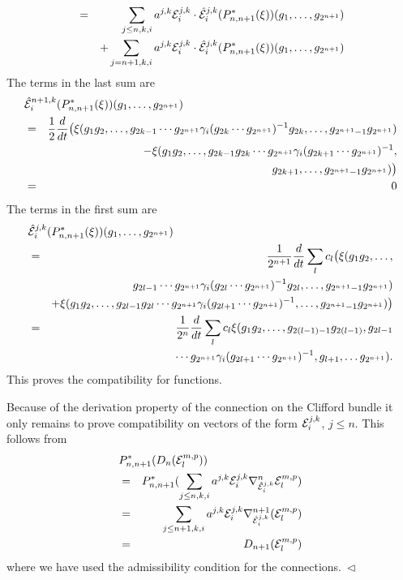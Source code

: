 \documentclass[12pt]{article}
\newcommand{\eproof}{{~\hfill$ \triangleleft$}}
\def\ce{{\cal E}}
\begin{document}
{\begin{eqnarray*}
&=&\sum_{j\leq n,k,i}a^{j,k}\ce_i^{j,k}\cdot \hat{\ce}_i^{j,k}(P^*_{n,n+1}(\xi ))(g_1,\ldots,g_{2^{n+1}})\\
&&+\sum_{j = n+1,k,i}a^{j,k}\ce_i^{j,k}\cdot \hat{\ce}_i^{j,k}(P^*_{n,n+1}(\xi ))(g_1,\ldots,g_{2^{n+1}})
\end{eqnarray*}
The terms in the last sum are
\begin{eqnarray*} 
\lefteqn{\hat{\ce}_i^{n+1,k}(P^*_{n,n+1}(\xi ))(g_1,\ldots,g_{2^{n+1}})}\\
&=& \frac{1}{2}\frac{d}{dt} \big( \xi (g_1g_2,\ldots,g_{2k-1}\cdots g_{2^{n+1}}\gamma_i(g_{2k}\cdots g_{2^{n+1}})^{-1}g_{2k},\ldots,g_{2^{n+1}-1}g_{2^{n+1}})\\
&& -\xi (g_1g_2,\ldots,g_{2k-1} g_{2k}\cdots g_{2^{n+1}}\gamma_i(g_{2k+1}\cdots g_{2^{n+1}})^{-1},\\
&&g_{2k+1},\ldots,g_{2^{n+1}-1}g_{2^{n+1}})\big) \\
&=&0
\end{eqnarray*}
The terms in the first sum are
\begin{eqnarray*}
\lefteqn{\hat{\ce}_i^{j,k}(P^*_{n,n+1}(\xi ))(g_1,\ldots,g_{2^{n+1}})}\\
&=&\frac{1}{2^{n+1}}\frac{d}{dt}\sum_l c_l\big( \xi (g_1g_2,\ldots ,\\
&&g_{2l-1}\cdots g_{2^{n+1}}\gamma_i(g_{2l}\cdots g_{2^{n+1}})^{-1}g_{2l},\ldots,g_{2^{n+1}-1}g_{2^{n+1}})\\
&&+\xi (g_1g_2,\ldots , g_{2l-1}g_{2l}\cdots g_{2^{n+1}}\gamma_i(g_{2l+1}\cdots g_{2^{n+1}})^{-1},\ldots,g_{2^{n+1}-1}g_{2^{n+1}})\big)\\
&=&\frac{1}{2^{n}}\frac{d}{dt}\sum_l c_l \xi(g_1g_2,\ldots, g_{2(l-1)-1}g_{2(l-1)},g_{2l-1}\\
&&\cdots g_{2^{n+1}}\gamma_i (g_{2l+1}\cdots  g_{2^{n+1}})^{-1},g_{l+1},\ldots g_{2^{n+1}}).
\end{eqnarray*}
This proves the compatibility for functions.

Because of the derivation property of the connection on the Clifford bundle it only remains to prove
compatibility on vectors of the form $\ce_i^{j,k}$, $j\leq n$. This follows from
\begin{eqnarray*}
\lefteqn{P^*_{n,n+1}(D_n( \ce_l^{m,p}))}\\
&=&P^*_{n,n+1}(\sum_{j\leq n,k,i}a^{j,k}\ce_i^{j,k}\nabla^n_{\hat{\ce}_i^{j,k}}\ce_l^{m,p})\\
&=&\sum_{j\leq n+1,k,i}a^{j,k}\ce_i^{j,k}\nabla^{n+1}_{\hat{\ce}_i^{j,k}}(\ce_l^{m,p})\\
&=&D_{n+1}(\ce_l^{m,p})
\end{eqnarray*}
where we have used the admissibility condition for the connections.\eproof


}
\end{document}
